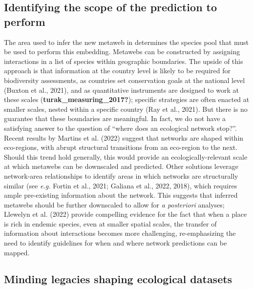 \documentclass[10pt,oneside]{article}
\begin{document}
\hypertarget{identifying-the-scope-of-the-prediction-to-perform}{%
\subsection{Identifying the scope of the prediction to
perform}\label{identifying-the-scope-of-the-prediction-to-perform}}

The area used to infer the new metaweb in determines the species pool
that must be used to perform this embedding. Metawebs can be constructed
by assigning interactions in a list of species within geographic
boundaries. The upside of this approach is that information at the
country level is likely to be required for biodiversity assessments, as
countries set conservation goals at the national level (Buxton et al.,
2021), and as quantitative instruments are designed to work at these
scales (\textbf{turak\_measuring\_2017?}); specific strategies are often
enacted at smaller scales, nested within a specific country (Ray et al.,
2021). But there is no guarantee that these boundaries are meaningful.
In fact, we do not have a satisfying answer to the question of ``where
does an ecological network stop?''. Recent results by Martins et al.
(2022) suggest that networks are shaped within eco-regions, with abrupt
structural transitions from an eco-region to the next. Should this trend
hold generally, this would provide an ecologically-relevant scale at
which metawebs can be downscaled and predicted. Other solutions leverage
network-area relationships to identify areas in which networks are
structurally similar (see \emph{e.g.} Fortin et al., 2021; Galiana et
al., 2022, 2018), which requires ample pre-existing information about
the network. This suggests that inferred metawebs should be further
downscaled to allow for \emph{a posteriori} analyses; Llewelyn et al.
(2022) provide compelling evidence for the fact that when a place is
rich in endemic species, even at smaller spatial scales, the transfer of
information about interactions becomes more challenging, re-emphasizing
the need to identify guidelines for when and where network predictions
can be mapped.

\hypertarget{minding-legacies-shaping-ecological-datasets}{%
\subsection{Minding legacies shaping ecological
datasets}\label{minding-legacies-shaping-ecological-datasets}}
\end{document}
